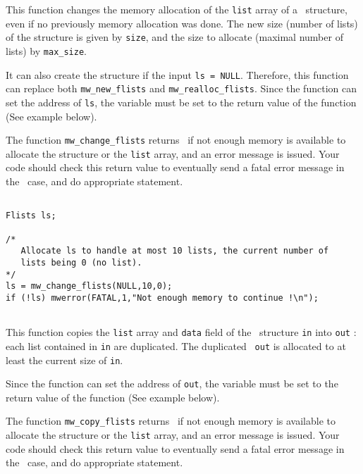 \Description
This function changes the memory allocation of the \verb+list+ array
of a \flists\ structure, even if no previously memory allocation was done.
The new size (number of lists) of the structure is given by \verb+size+,
and the size to allocate (maximal number of lists) by \verb+max_size+.

It can also create the structure if the input \verb+ls = NULL+.
Therefore, this function can replace both \verb+mw_new_flists+ and
\verb+mw_realloc_flists+. 
Since the function can set the address of \verb+ls+, the variable must be set 
to the return value of the function (See example below).

The function \verb+mw_change_flists+ returns \Null\ if not enough memory is 
available to allocate the structure or the \verb+list+ array, and an error 
message is issued. 
Your code should check this return value to eventually send a fatal error 
message in the \Null\ case, and do appropriate statement.

\Next
\Example
\begin{verbatim}

Flists ls;

/* 
   Allocate ls to handle at most 10 lists, the current number of
   lists being 0 (no list).
*/
ls = mw_change_flists(NULL,10,0);
if (!ls) mwerror(FATAL,1,"Not enough memory to continue !\n");


\end{verbatim}

\newpage %


\Description
This function copies the \verb+list+ array and \verb+data+ field 
of the \flists\ structure \verb+in+ into \verb+out+ : 
each list contained in \verb+in+ are duplicated. 
The duplicated \flists\ \verb+out+ is allocated to at least
the current size of \verb+in+. 

Since the function can set the address of \verb+out+, the variable must be set 
to the return value of the function (See example below).

The function \verb+mw_copy_flists+ returns \Null\ if not enough memory is 
available to allocate the structure or the \verb+list+ array, and an error 
message is issued. 
Your code should check this return value to eventually send a fatal error 
message in the \Null\ case, and do appropriate statement.

